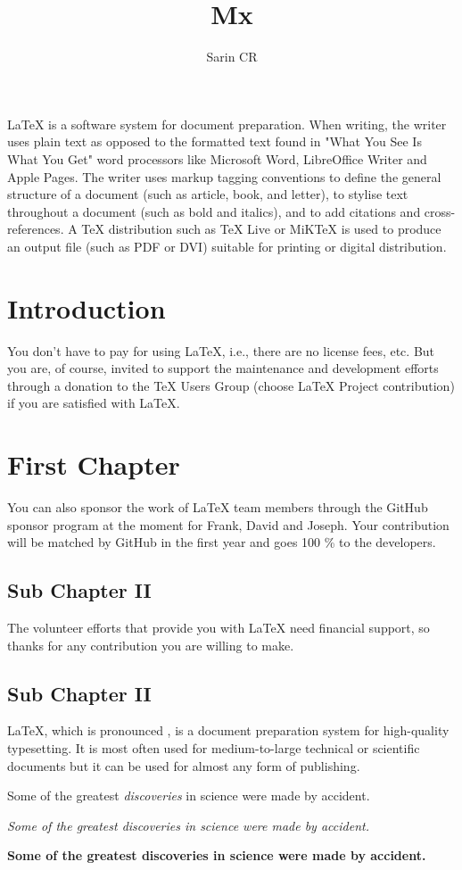 \documentclass[10pt,a4paper]{article}
\title{Mx}
\author{Sarin CR}
\begin{document}
\maketitle

LaTeX  is a software system for document preparation. When writing, the writer uses plain text as opposed to the formatted text found in "What You See Is What You Get" word processors like Microsoft Word, LibreOffice Writer and Apple Pages. The writer uses markup tagging conventions to define the general structure of a document (such as article, book, and letter), to stylise text throughout a document (such as bold and italics), and to add citations and cross-references. A TeX distribution such as TeX Live or MiKTeX is used to produce an output file (such as PDF or DVI) suitable for printing or digital distribution. 

\section{Introduction}
You don't have to pay for using LaTeX, i.e., there are no license fees, etc. But you are, of course, invited to support the maintenance and development efforts through a donation to the TeX Users Group (choose LaTeX Project contribution) if you are satisfied with LaTeX.
\section{First Chapter}
You can also sponsor the work of LaTeX team members through the GitHub sponsor program at the moment for Frank, David and Joseph. Your contribution will be matched by GitHub in the first year and goes 100 \% to the developers. 
\subsection{Sub Chapter II}
The volunteer efforts that provide you with LaTeX need financial support, so thanks for any contribution you are willing to make.
\subsection{Sub Chapter II}
LaTeX, which is pronounced  , is a document preparation system for high-quality typesetting. It is most often used for medium-to-large technical or scientific documents but it can be used for almost any form of publishing.

Some of the greatest \emph{discoveries} in science were made by accident.

\textit{Some of the greatest discoveries in science  were made by accident.}

\textbf{Some of the greatest discoveries in science were made by accident.}
\end{document}
